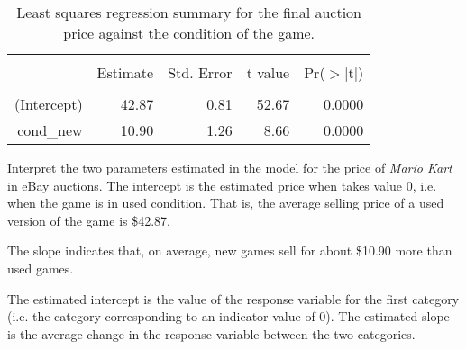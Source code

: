 \begin{table}
\centering
\begin{tabular}{rrrrr}
  \hline
  \vspace{-3.7mm} & & & & \\
 & Estimate & Std. Error & t value & Pr($>$$|$t$|$) \\ 
  \hline
  \vspace{-3.6mm} & & & & \\
(Intercept) & 42.87 & 0.81 & 52.67 & 0.0000 \\ 
  cond\_\hspace{0.3mm}new & 10.90 & 1.26 & 8.66 & 0.0000 \\ 
   \hline
\end{tabular}
\caption{Least squares regression summary for the final auction price against the condition of the game.}
\label{marioKartNewUsedRegrSummary}
\end{table}

\begin{example}{Interpret the two parameters estimated in the model for the price of \emph{Mario Kart} in eBay auctions.}
The intercept is the estimated price when  takes value 0, i.e. when the game is in used condition. That is, the average selling price of a used version of the game is \$42.87.

The slope indicates that, on average, new games sell for about \$10.90 more than used games.
\end{example}

\begin{tipBox}{
The estimated intercept is the value of the response variable for the first category (i.e. the category corresponding to an indicator value of 0). The estimated slope is the average change in the response variable between the two categories.}
\end{tipBox}




